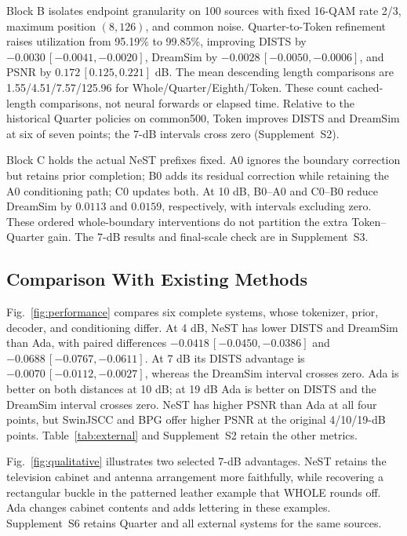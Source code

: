Block B isolates endpoint granularity on 100 sources with fixed 16-QAM rate 2/3, maximum position $(8,126)$, and common noise. Quarter-to-Token refinement raises utilization from 95.19\% to 99.85\%, improving DISTS by $-0.0030\,[-0.0041,-0.0020]$, DreamSim by $-0.0028\,[-0.0050,-0.0006]$, and PSNR by $0.172\,[0.125,0.221]$ dB. The mean descending length comparisons are 1.55/4.51/7.57/125.96 for Whole/Quarter/Eighth/Token. These count cached-length comparisons, not neural forwards or elapsed time. Relative to the historical Quarter policies on common500, Token improves DISTS and DreamSim at six of seven points; the 7-dB intervals cross zero (Supplement~S2).

Block C holds the actual NeST prefixes fixed. A0 ignores the boundary correction but retains prior completion; B0 adds its residual correction while retaining the A0 conditioning path; C0 updates both. At 10 dB, B0--A0 and C0--B0 reduce DreamSim by $0.0113$ and $0.0159$, respectively, with intervals excluding zero. These ordered whole-boundary interventions do not partition the extra Token--Quarter gain. The 7-dB results and final-scale check are in Supplement~S3.

\subsection{Comparison With Existing Methods}
\ifCLASSOPTIONonecolumn\fi

Fig.~\ref{fig:performance} compares six complete systems, whose tokenizer, prior, decoder, and conditioning differ. At 4 dB, NeST has lower DISTS and DreamSim than Ada, with paired differences $-0.0418\,[-0.0450,-0.0386]$ and $-0.0688\,[-0.0767,-0.0611]$. At 7 dB its DISTS advantage is $-0.0070\,[-0.0112,-0.0027]$, whereas the DreamSim interval crosses zero. Ada is better on both distances at 10 dB; at 19 dB Ada is better on DISTS and the DreamSim interval crosses zero. NeST has higher PSNR than Ada at all four points, but SwinJSCC and BPG offer higher PSNR at the original 4/10/19-dB points. Table~\ref{tab:external} and Supplement~S2 retain the other metrics.

Fig.~\ref{fig:qualitative} illustrates two selected 7-dB advantages. NeST retains the television cabinet and antenna arrangement more faithfully, while recovering a rectangular buckle in the patterned leather example that WHOLE rounds off. Ada changes cabinet contents and adds lettering in these examples. Supplement~S6 retains Quarter and all external systems for the same sources.

